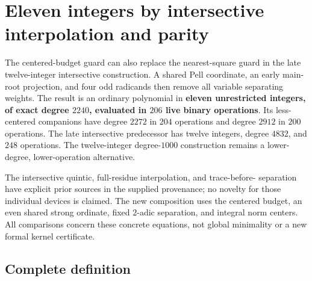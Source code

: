 \section{Eleven integers by intersective interpolation and parity}
\label{sec:eleven-intersective-budget}

The centered-budget guard can also replace the nearest-square guard in
the late twelve-integer intersective construction. A shared Pell
coordinate, an early main-root projection, and four odd radicands then
remove all variable separating weights. The result is an ordinary
polynomial in \textbf{eleven unrestricted integers, of exact degree
$2240$, evaluated in $206$ live binary operations}. Its less-centered
companions have degree $2272$ in $204$ operations and degree $2912$ in
$200$ operations. The late intersective predecessor has twelve integers,
degree $4832$, and $248$ operations. The twelve-integer degree-$1000$
construction remains a lower-degree, lower-operation alternative.

The intersective quintic, full-residue interpolation, and trace-before-
separation have explicit prior sources in the supplied provenance; no
novelty for those individual devices is claimed. The new composition
uses the centered budget, an even shared strong ordinate, fixed
$2$-adic separation, and integral norm centers. All comparisons concern
these concrete equations, not global minimality or a new formal
kernel certificate.

\subsection{Complete definition}


